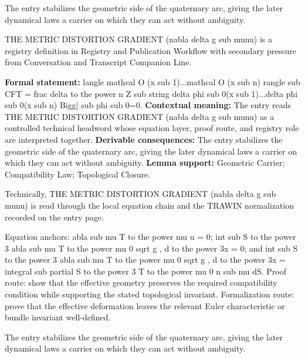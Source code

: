 The entry stabilizes the geometric side of the quaternary arc, giving the later dynamical laws a carrier on which they can act without ambiguity.
\clearpage


\begingroup\small
{}
THE METRIC DISTORTION GRADIENT (nabla delta g sub munu) is a registry definition in Registry and Publication Workflow with secondary pressure from Conversation and Transcript Companion Line.

\begingroup\footnotesize\setlength{\emergencystretch}{3em}\sloppy
\textbf{Formal statement:} langle mathcal O (x sub 1)...mathcal O (x sub n) rangle sub CFT = frac delta to the power n Z sub string delta phi sub 0(x sub 1)...delta phi sub 0(x sub n) Bigg| sub phi sub 0=0. \textbf{Contextual meaning:} The entry reads THE METRIC DISTORTION GRADIENT (nabla delta g sub munu) as a controlled technical headword whose equation layer, proof route, and registry role are interpreted together. \textbf{Derivable consequences:} The entry stabilizes the geometric side of the quaternary arc, giving the later dynamical laws a carrier on which they can act without ambiguity. \textbf{Lemma support:} Geometric Carrier; Compatibility Law; Topological Closure.\par
\endgroup

Technically, THE METRIC DISTORTION GRADIENT (nabla delta g sub munu) is read through the local equation chain and the TRAWIN normalization recorded on the entry page.

Equation anchors: abla sub mu T to the power mu u = 0; int sub S to the power 3 abla sub mu T to the power mu 0 sqrt g , d to the power 3x = 0; and int sub S to the power 3 abla sub mu T to the power mu 0 sqrt g , d to the power 3x = integral sub partial S to the power 3 T to the power mu 0 n sub mu dS. Proof route: show that the effective geometry preserves the required compatibility condition while supporting the stated topological invariant. Formalization route: prove that the effective deformation leaves the relevant Euler characteristic or bundle invariant well-defined.

The entry stabilizes the geometric side of the quaternary arc, giving the later dynamical laws a carrier on which they can act without ambiguity.
\endgroup

